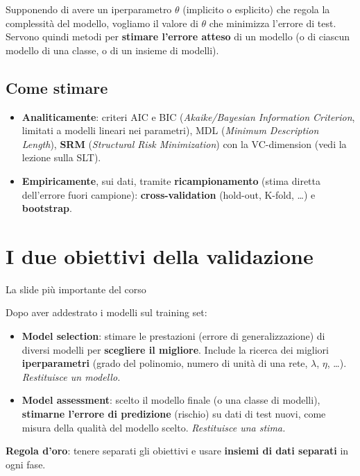 Supponendo di avere un iperparametro \(\theta\) (implicito o esplicito)
che regola la complessità del modello, vogliamo il valore di \(\theta\)
che minimizza l'errore di test. Servono quindi metodi per
\textbf{stimare l'errore atteso} di un modello (o di ciascun modello di
una classe, o di un insieme di modelli).

\subsection{Come stimare}\label{come-stimare}

\begin{itemize}
\tightlist
\item
  \textbf{Analiticamente}: criteri AIC e BIC (\emph{Akaike/Bayesian
  Information Criterion}, limitati a modelli lineari nei parametri), MDL
  (\emph{Minimum Description Length}), \textbf{SRM} (\emph{Structural
  Risk Minimization}) con la VC-dimension (vedi la lezione sulla SLT).
\item
  \textbf{Empiricamente}, sui dati, tramite \textbf{ricampionamento}
  (stima diretta dell'errore fuori campione): \textbf{cross-validation}
  (hold-out, K-fold, \ldots) e \textbf{bootstrap}.
\end{itemize}

\section{I due obiettivi della
validazione}\label{i-due-obiettivi-della-validazione}

\begin{boxwarning}{La slide più importante del corso}

Dopo aver addestrato i modelli sul training set:

\begin{itemize}
\tightlist
\item
  \textbf{Model selection}: stimare le prestazioni (errore di
  generalizzazione) di diversi modelli per \textbf{scegliere il
  migliore}. Include la ricerca dei migliori \textbf{iperparametri}
  (grado del polinomio, numero di unità di una rete, \(\lambda\),
  \(\eta\), \ldots). \emph{Restituisce un modello.}
\item
  \textbf{Model assessment}: scelto il modello finale (o una classe di
  modelli), \textbf{stimarne l'errore di predizione} (rischio) su dati
  di test nuovi, come misura della qualità del modello scelto.
  \emph{Restituisce una stima.}
\end{itemize}

\textbf{Regola d'oro}: tenere separati gli obiettivi e usare
\textbf{insiemi di dati separati} in ogni fase.

\end{boxwarning}

